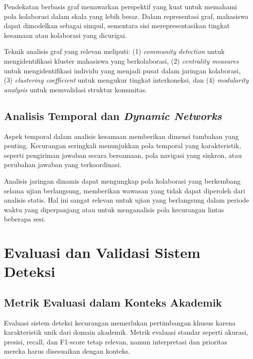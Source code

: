 Pendekatan berbasis graf menawarkan perspektif yang kuat untuk memahami pola kolaborasi dalam skala yang lebih besar. Dalam representasi graf, mahasiswa dapat dimodelkan sebagai simpul, sementara sisi merepresentasikan tingkat kesamaan atau kolaborasi yang dicurigai.

Teknik analisis graf yang relevan meliputi: (1) \textit{community detection} untuk mengidentifikasi kluster mahasiswa yang berkolaborasi, (2) \textit{centrality measures} untuk mengidentifikasi individu yang menjadi pusat dalam jaringan kolaborasi, (3) \textit{clustering coefficient} untuk mengukur tingkat interkoneksi, dan (4) \textit{modularity analysis} untuk memvalidasi struktur komunitas.

\subsection{Analisis Temporal dan \textit{Dynamic Networks}}

Aspek temporal dalam analisis kesamaan memberikan dimensi tambahan yang penting. Kecurangan seringkali menunjukkan pola temporal yang karakteristik, seperti pengiriman jawaban secara bersamaan, pola navigasi yang sinkron, atau perubahan jawaban yang terkoordinasi.

Analisis jaringan dinamis dapat mengungkap pola kolaborasi yang berkembang selama ujian berlangsung, memberikan wawasan yang tidak dapat diperoleh dari analisis statis. Hal ini sangat relevan untuk ujian yang berlangsung dalam periode waktu yang diperpanjang atau untuk menganalisis pola kecurangan lintas beberapa sesi.

\section{Evaluasi dan Validasi Sistem Deteksi}
\label{sec:evaluationValidation}

\subsection{Metrik Evaluasi dalam Konteks Akademik}

Evaluasi sistem deteksi kecurangan memerlukan pertimbangan khusus karena karakteristik unik dari domain akademik. Metrik evaluasi standar seperti akurasi, presisi, recall, dan F1-score tetap relevan, namun interpretasi dan prioritas mereka harus disesuaikan dengan konteks.

